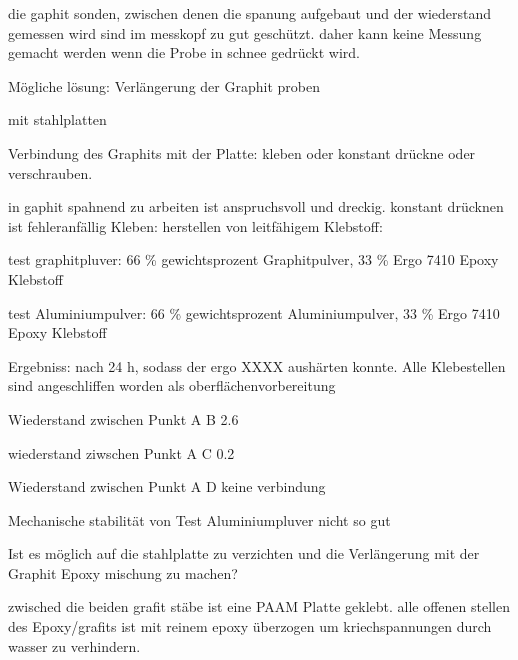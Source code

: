 die gaphit sonden, zwischen denen die spanung aufgebaut und der wiederstand gemessen wird sind im messkopf zu gut geschützt. daher kann keine Messung gemacht werden wenn die Probe in schnee gedrückt wird.

Mögliche lösung: Verlängerung der Graphit proben

mit stahlplatten

Verbindung des Graphits mit der Platte: kleben oder konstant drückne oder verschrauben.

in gaphit spahnend zu arbeiten ist anspruchsvoll und dreckig.
konstant drücknen ist fehleranfällig
Kleben: herstellen von leitfähigem Klebstoff:

test graphitpluver: 66 \% gewichtsprozent Graphitpulver, 33 \% Ergo 7410 Epoxy Klebstoff

test Aluminiumpulver: 66 \% gewichtsprozent Aluminiumpulver, 33 \% Ergo 7410 Epoxy Klebstoff


Ergebniss: nach 24 h, sodass der ergo XXXX aushärten konnte.
Alle Klebestellen sind angeschliffen worden als oberflächenvorbereitung

Wiederstand zwischen Punkt A B 2.6 \ohm

wiederstand ziwschen Punkt A C 0.2 \ohm

Wiederstand zwischen Punkt A D keine verbindung

Mechanische stabilität von Test Aluminiumpluver nicht so gut

Ist es möglich auf die stahlplatte zu verzichten und die Verlängerung mit der Graphit Epoxy mischung zu machen?

zwisched die beiden grafit stäbe ist eine PAAM Platte geklebt. alle offenen stellen des Epoxy/grafits ist mit reinem epoxy überzogen um kriechspannungen durch wasser zu verhindern.
